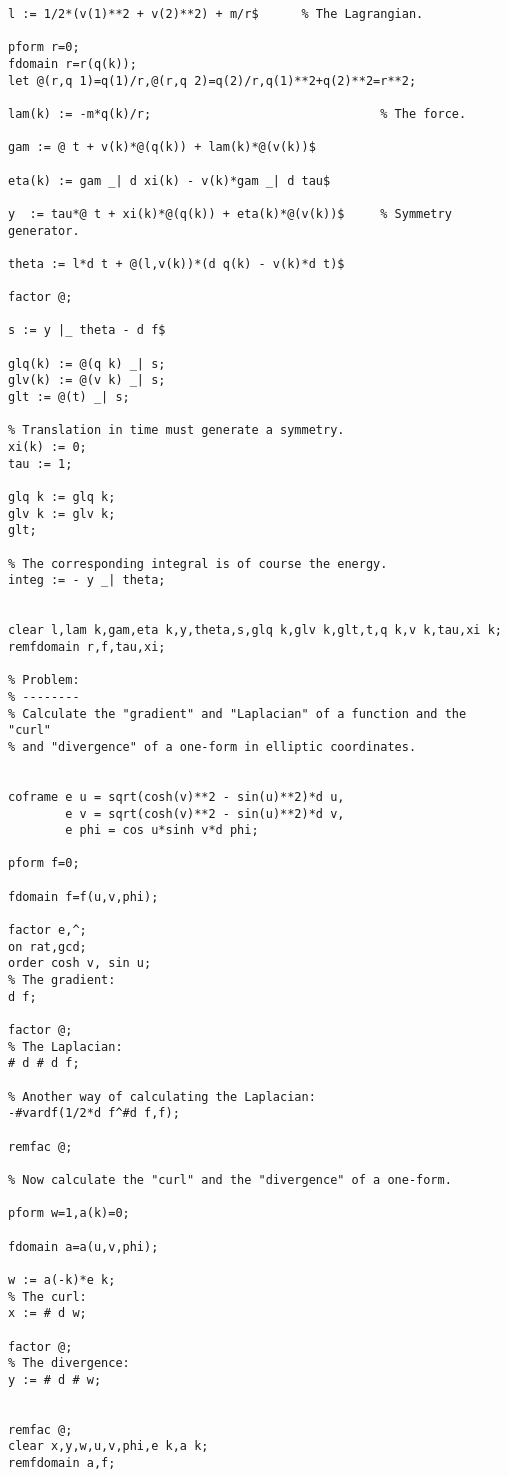 {\begin{verbatim}
l := 1/2*(v(1)**2 + v(2)**2) + m/r$      % The Lagrangian.

pform r=0;
fdomain r=r(q(k));
let @(r,q 1)=q(1)/r,@(r,q 2)=q(2)/r,q(1)**2+q(2)**2=r**2;

lam(k) := -m*q(k)/r;                                % The force.

gam := @ t + v(k)*@(q(k)) + lam(k)*@(v(k))$

eta(k) := gam _| d xi(k) - v(k)*gam _| d tau$

y  := tau*@ t + xi(k)*@(q(k)) + eta(k)*@(v(k))$     % Symmetry generator.

theta := l*d t + @(l,v(k))*(d q(k) - v(k)*d t)$

factor @;

s := y |_ theta - d f$

glq(k) := @(q k) _| s;
glv(k) := @(v k) _| s;
glt := @(t) _| s;

% Translation in time must generate a symmetry.
xi(k) := 0;
tau := 1;

glq k := glq k;
glv k := glv k;
glt;

% The corresponding integral is of course the energy.
integ := - y _| theta;


clear l,lam k,gam,eta k,y,theta,s,glq k,glv k,glt,t,q k,v k,tau,xi k;
remfdomain r,f,tau,xi;

% Problem:
% --------
% Calculate the "gradient" and "Laplacian" of a function and the "curl"
% and "divergence" of a one-form in elliptic coordinates.


coframe e u = sqrt(cosh(v)**2 - sin(u)**2)*d u,
        e v = sqrt(cosh(v)**2 - sin(u)**2)*d v,
        e phi = cos u*sinh v*d phi;

pform f=0;

fdomain f=f(u,v,phi);

factor e,^;
on rat,gcd;
order cosh v, sin u;
% The gradient:
d f;

factor @;
% The Laplacian:
# d # d f;

% Another way of calculating the Laplacian:
-#vardf(1/2*d f^#d f,f);

remfac @;

% Now calculate the "curl" and the "divergence" of a one-form.

pform w=1,a(k)=0;

fdomain a=a(u,v,phi);

w := a(-k)*e k;
% The curl:
x := # d w;

factor @;
% The divergence:
y := # d # w;


remfac @;
clear x,y,w,u,v,phi,e k,a k;
remfdomain a,f;



\end{verbatim}}
